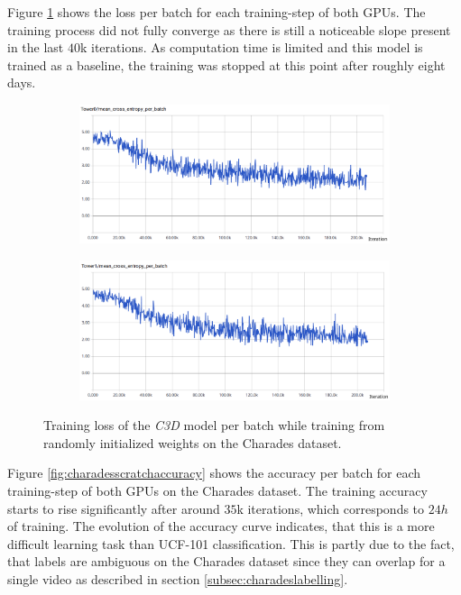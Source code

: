 Figure \ref{fig:charadesscratchloss} shows the loss per batch for each training-step of both GPUs.
The training process did not fully converge as there is still a noticeable slope present in the last $40$k iterations.
As computation time is limited and this model is trained as a baseline, the training was stopped at this point after roughly eight days.

\begin{figure}[H]
    \begin{subfigure}[c]{\textwidth}
    \centering
    \includegraphics[width=\textwidth]{img_evaluation/charades_scratch/tower0crossentropy}
    \end{subfigure}
    \begin{subfigure}[c]{\textwidth}
    \includegraphics[width=\textwidth]{img_evaluation/charades_scratch/tower1crossentropy}
    \end{subfigure}
    \caption{Training loss of the \textit{C3D} model per batch while training from randomly initialized weights on the Charades dataset.}
    \label{fig:charadesscratchloss}
\end{figure}

Figure \ref{fig:charadesscratchaccuracy} shows the accuracy per batch for each training-step of both GPUs on the Charades dataset.
The training accuracy starts to rise significantly after around $35$k iterations, which corresponds to $24h$ of training.
The evolution of the accuracy curve indicates, that this is a more difficult learning task than UCF-101 classification.
This is partly due to the fact, that labels are ambiguous on the Charades dataset since they can overlap for a single video as described in section \ref{subsec:charadeslabelling}.

